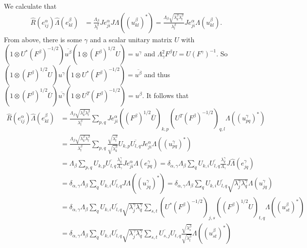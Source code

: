 \documentclass[twoside,a4paper,12pt]{article}
\theoremstyle{plain}
\theoremstyle{definition}
\begin{document}
We calculate that
\begin{align*}
\hat R(e^\alpha_{ij}) \hat\Lambda(e^\beta_{kl})
&= \frac{\Lambda_\beta}{\lambda^\beta_l} J e^\alpha_{ji} J
   \Lambda((u^\beta_{kl})^*)
= \frac{\Lambda_\beta\sqrt{\lambda^\beta_k\lambda^\beta_l}}{\lambda^\beta_l}
   J e^\alpha_{ji} \Lambda(u^\beta_{kl}).
\end{align*}
From above, there is some $\gamma$ and a scalar unitary matrix $U$ with
$(1\otimes U^* (F^\beta)^{-1/2}) \overline{u^\beta} (1\otimes
(F^\beta)^{1/2} U) = u^\gamma$ and $\Lambda^2_\gamma F^\beta U
= U (F^\gamma)^{-1}$.  So $(1\otimes (F^\beta)^{1/2}U)u^\gamma
(1\otimes U^* (F^\beta)^{-1/2}) = \overline{u^\beta}$ and thus
$(1\otimes (F^\beta)^{1/2}\overline{U})\overline{u^\gamma}
(1\otimes U^T (F^\beta)^{-1/2}) = u^\beta$.  It follows that
\begin{align*} \hat R(e^\alpha_{ij}) \hat\Lambda(e^\beta_{kl})
&= \frac{\Lambda_\beta\sqrt{\lambda^\beta_k\lambda^\beta_l}}{\lambda^\beta_l}
   \sum_{p,q} J e^\alpha_{ji} ((F^\beta)^{1/2}\overline{U})_{k,p}
   (U^T (F^\beta)^{-1/2})_{q,l} \Lambda((u^\gamma_{pq})^*) \\
&= \frac{\Lambda_\beta\sqrt{\lambda^\beta_k\lambda^\beta_l}}{\lambda^\beta_l}
   \sum_{p,q} \frac{\sqrt{\lambda^\beta_l}}{\sqrt{\lambda^\beta_k}} U_{k,p}
   \overline{U_{l,q}} J e^\alpha_{ji} \Lambda((u^\gamma_{pq})^*) \\
&= \Lambda_\beta \sum_{p,q}  U_{k,p} \overline{U_{l,q}}
   \frac{\lambda^\gamma_q}{\Lambda_\gamma}
   J e^\alpha_{ji} \Lambda(e^\gamma_{pq})
= \delta_{\alpha,\gamma} \Lambda_\beta \sum_{q}  U_{k,i} \overline{U_{l,q}}
   \frac{\lambda^\gamma_q}{\Lambda_\gamma} J \hat\Lambda(e^\gamma_{jq}) \\
&= \delta_{\alpha,\gamma} \Lambda_\beta \sum_{q}  U_{k,i} \overline{U_{l,q}}
   J \Lambda((u^\gamma_{jq})^*)
= \delta_{\alpha,\gamma} \Lambda_\beta \sum_{q}  U_{k,i} \overline{U_{l,q}}
   \sqrt{\lambda^\gamma_j\lambda^\gamma_q} \Lambda(u^\gamma_{jq}) \\
&= \delta_{\alpha,\gamma} \Lambda_\beta \sum_{q}  U_{k,i} \overline{U_{l,q}}
   \sqrt{\lambda^\gamma_j\lambda^\gamma_q}
   \sum_{s,t} (U^*(F^\beta)^{-1/2})_{j,s} ((F^\beta)^{1/2} U)_{t,q}
   \Lambda((u^\beta_{st})^*) \\
&= \delta_{\alpha,\gamma} \Lambda_\beta \sum_{q}  U_{k,i} \overline{U_{l,q}}
   \sqrt{\lambda^\gamma_j\lambda^\gamma_q}
   \sum_{s,t} \overline{U_{s,j}} U_{t,q}
   \frac{\sqrt{\lambda^\beta_s}}{\sqrt{\lambda^\beta_t}}
   \Lambda((u^\beta_{st})^*)
\end{align*}
\end{document}
